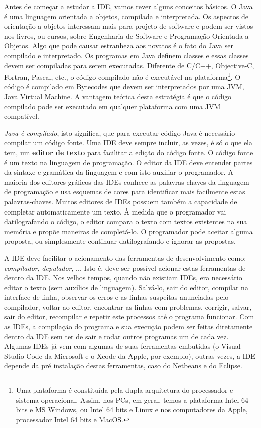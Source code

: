 \documentclass[
	12pt,				%
	twoside,			%
	a4paper,			%
	english,			%
	french,				%
	spanish,			%
	brazil				%
	]{abntex2}
\begin{document}
Antes de começar a estudar a IDE, vamos rever alguns conceitos básicos. O Java é uma linguagem orientada a objetos, compilada e interpretada. Os aspectos de orientação a objetos interessam mais para projeto de software e podem ser vistos nos livros, ou cursos, sobre Engenharia de Software e Programação Orientada a Objetos. Algo que pode causar estranheza aos novatos é o fato do Java ser compilado e interpretado. Os programas em Java definem classes e essas classes devem ser compiladas para serem executadas. Diferente de C/C++, Objective-C, Fortran, Pascal, etc., o código compilado não é executável na plataforma\footnote{Uma plataforma é constituída pela dupla arquitetura do processador e sistema operacional. Assim, nos PCs, em geral, temos a plataforma Intel 64 bits e MS Windows, ou Intel 64 bits e Linux e nos computadores da Apple, processador Intel 64 bits e MacOS.}. O código é compilado em Bytecodes que devem ser interpretados por uma JVM, Java Virtual Machine. A vantagem teórica desta estratégia é que o código compilado pode ser executado em qualquer plataforma com uma JVM compatível.

\emph{Java é compilado}, isto significa, que para executar código Java é necessário compilar um código fonte. Uma IDE deve sempre incluir, as vezes, é só o que ela tem, um \textbf{editor de texto} para facilitar a edição do código fonte. O código fonte é um texto na linguagem de programação. O editor da IDE deve entender partes da sintaxe e gramática da linguagem e com isto auxiliar o programador. A maioria dos editores gráficos das IDEs conhece as palavras chaves da linguagem de programação e usa esquemas de cores para identificar mais facilmente estas palavras-chaves. Muitos editores de IDEs possuem também a capacidade de completar automaticamente um texto. À medida que o programador vai datilografando o código, o editor compara o texto com textos existentes na sua memória e propõe maneiras de completá-lo. O programador pode aceitar alguma proposta, ou simplesmente continuar datilografando e ignorar as propostas.

A IDE deve facilitar o acionamento das ferramentas de desenvolvimento como: \textit{compilador}, \emph{depulador}, ... Isto é, deve ser possível acionar estas ferramentas de dentro da IDE. Nos velhos tempos, quando não existiam IDEs, era necessário editar o texto (sem auxílios de linguagem). Salvá-lo, sair do editor, compilar na interface de linha, observar os erros e as linhas suspeitas anunciadas pelo compilador, voltar ao editor, encontrar as linhas com problemas, corrigir, salvar, sair do editor, recompilar e repetir este processos até o programa funcionar. Com as IDEs, a compilação do programa e sua execução podem ser feitas diretamente dentro da IDE sem ter de sair e rodar outros programas um de cada vez. Algumas IDEs já vem com algumas de suas ferramentas embutidas (o Visual Studio Code da Microsoft e o Xcode da Apple, por exemplo), outras vezes, a IDE depende da pré instalação destas ferramentas, caso do Netbeans e do Eclipse.
\end{document}
